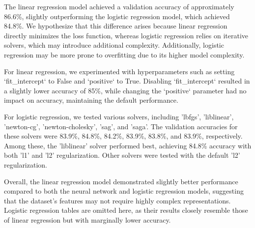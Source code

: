 The linear regression model achieved a validation accuracy of approximately 86.6\%, slightly outperforming the logistic regression model, which achieved 84.8\%. We hypothesize that this difference arises because linear regression directly minimizes the loss function, whereas logistic regression relies on iterative solvers, which may introduce additional complexity. Additionally, logistic regression may be more prone to overfitting due to its higher model complexity.

For linear regression, we experimented with hyperparameters such as setting `fit\_intercept` to False and `positive` to True. Disabling `fit\_intercept` resulted in a slightly lower accuracy of 85\%, while changing the `positive` parameter had no impact on accuracy, maintaining the default performance.

For logistic regression, we tested various solvers, including 'lbfgs', 'liblinear', 'newton-cg', 'newton-cholesky', 'sag', and 'saga'. The validation accuracies for these solvers were 83.9\%, 84.8\%, 84.2\%, 83.9\%, 83.8\%, and 83.9\%, respectively. Among these, the 'liblinear' solver performed best, achieving 84.8\% accuracy with both 'l1' and 'l2' regularization. Other solvers were tested with the default 'l2' regularization.

Overall, the linear regression model demonstrated slightly better performance compared to both the neural network and logistic regression models, suggesting that the dataset's features may not require highly complex representations. Logistic regression tables are omitted here, as their results closely resemble those of linear regression but with marginally lower accuracy.

